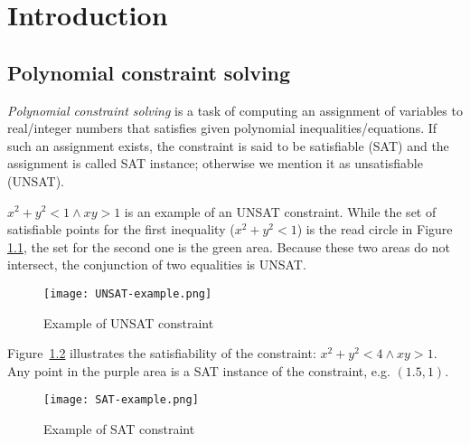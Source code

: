 \chapter{Introduction}
\section{Polynomial constraint solving}
{\em Polynomial constraint solving} is a task of computing an assignment of variables to real/integer numbers 
that satisfies given polynomial inequalities/equations. If such an assignment exists, the constraint is said to be satisfiable (SAT) and the assignment is called SAT instance; otherwise we mention it as unsatisfiable (UNSAT). 
\begin{example} \label{examp:unsat-example}
$x^2 + y^2 < 1 \wedge xy > 1$ is an example of an UNSAT constraint. While the set of satisfiable points for the first inequality ($x^2 + y^2 < 1$) is the read circle in Figure \ref{fig:unsat-example}, the set for the second one is the green area. Because these two areas do not intersect, the conjunction of two equalities is UNSAT.
\end{example}

\begin{figure}[ht]
\centering
\texttt{[image: UNSAT-example.png]} 
\caption{Example of UNSAT constraint} 
\label{fig:unsat-example} 
\end{figure} 

\begin{example} \label{examp:sat-example}
Figure~\ref{fig:sat-example} illustrates the satisfiability of the constraint: $x^2 + y^2 < 4 \wedge xy > 1$. Any point in the purple area is a SAT instance of the constraint, e.g. $(1.5, 1)$.
\end{example}

\begin{figure}[ht]
\centering
\texttt{[image: SAT-example.png]} 
\caption{Example of SAT constraint} 
\label{fig:sat-example} 
\end{figure} 

